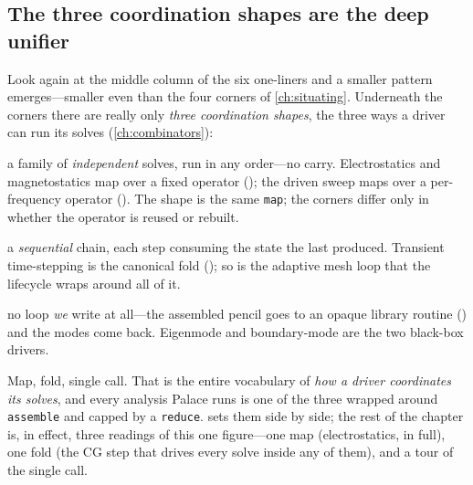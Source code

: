 \subsection{The three coordination shapes are the deep unifier}

Look again at the middle column of the six one-liners and a smaller pattern
emerges---smaller even than the four corners of \cref{ch:situating}. Underneath the
corners there are really only \emph{three coordination shapes}, the three ways a
driver can run its solves (\cref{ch:combinators}):

\begin{description}[style=nextline, leftmargin=0pt, font=\normalfont\itshape]
  \item[map] a family of \emph{independent} solves, run in any order---no carry.
  Electrostatics and magnetostatics map over a fixed operator ();
  the driven sweep maps over a per-frequency operator (). The
  shape is the same \texttt{map}; the corners differ only in whether the operator is
  reused or rebuilt.
  \item[fold] a \emph{sequential} chain, each step consuming the state the last
  produced. Transient time-stepping is the canonical fold (); so is
  the adaptive mesh loop that the lifecycle wraps around all of it.
  \item[single call] no loop \emph{we} write at all---the assembled pencil goes to an
  opaque library routine () and the modes come back. Eigenmode and
  boundary-mode are the two black-box drivers.
\end{description}

\noindent Map, fold, single call. That is the entire vocabulary of \emph{how a
driver coordinates its solves}, and every analysis Palace runs is one of the three
wrapped around \texttt{assemble} and capped by a \texttt{reduce}. 
sets them side by side; the rest of the chapter is, in effect, three readings of
this one figure---one map (electrostatics, in full), one fold (the CG step that
drives every solve inside any of them), and a tour of the single call.

